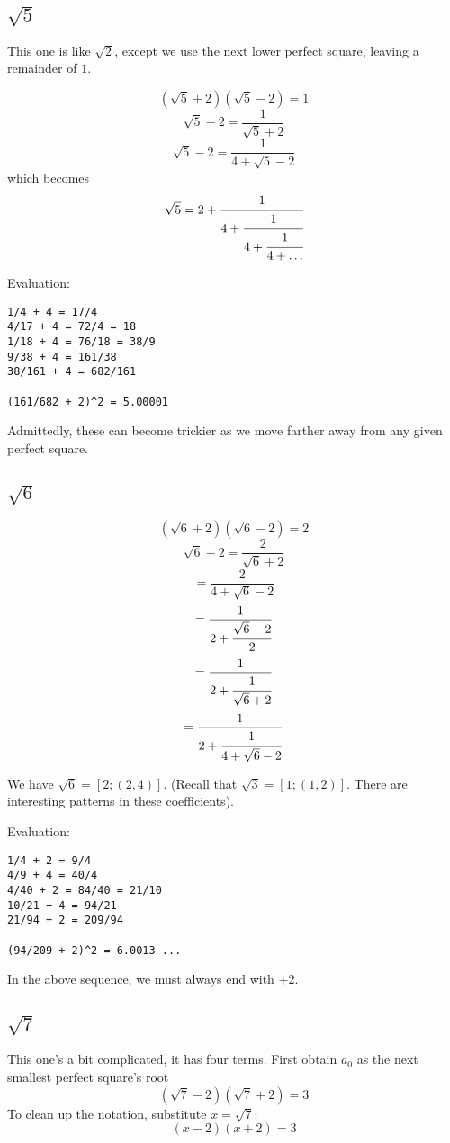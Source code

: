 \documentclass[11pt, oneside]{article}
\begin{document}
\subsection*{$\sqrt{5}$}
This one is like $\sqrt{2}$, except we use the next lower perfect square, leaving a remainder of $1$.

\[ (\sqrt{5} + 2)(\sqrt{5} - 2) = 1 \]
\[ \sqrt{5} - 2 = \frac{1}{\sqrt{5} + 2} \]
\[ \sqrt{5} - 2 = \frac{1}{4 + \sqrt{5} - 2} \]
which becomes
\[ \sqrt{5} = 2 + \cfrac{1}{4 + \cfrac{1}{4 + \cfrac{1}{4 + \dots}}}  \]

Evaluation:
\begin{verbatim}
1/4 + 4 = 17/4
4/17 + 4 = 72/4 = 18
1/18 + 4 = 76/18 = 38/9
9/38 + 4 = 161/38
38/161 + 4 = 682/161

(161/682 + 2)^2 = 5.00001
\end{verbatim}

Admittedly, these can become trickier as we move farther away from any given perfect square.

\subsection*{$\sqrt{6}$}

\[ (\sqrt{6} + 2)(\sqrt{6} - 2) = 2 \]
\[ \sqrt{6} - 2 = \frac{2}{\sqrt{6} + 2} \]
\[ = \frac{2}{4 + \sqrt{6} - 2} \]
\[ = \frac{1}{2 + \cfrac{\sqrt{6} - 2}{2}} \]
\[ = \frac{1}{2 + \cfrac{1}{\sqrt{6} + 2}} \]
\[ = \frac{1}{2 + \cfrac{1}{4 + \sqrt{6} - 2}} \]

We have $\sqrt{6} = [2;(2,4)]$.  (Recall that $\sqrt{3} =  [1;(1,2)]$.  There are interesting patterns in these coefficients).

Evaluation:
\begin{verbatim}
1/4 + 2 = 9/4
4/9 + 4 = 40/4
4/40 + 2 = 84/40 = 21/10
10/21 + 4 = 94/21
21/94 + 2 = 209/94

(94/209 + 2)^2 = 6.0013 ...
\end{verbatim}

In the above sequence, we must always end with $+ 2$.

\subsection*{$\sqrt{7}$}

This one's a bit complicated, it has four terms.  First obtain $a_0$ as the next smallest perfect square's root
\[ (\sqrt{7} - 2)(\sqrt{7} + 2) = 3 \]
To clean up the notation, substitute $x = \sqrt{7}$:
\[ (x - 2)(x + 2) = 3 \]
\end{document}
